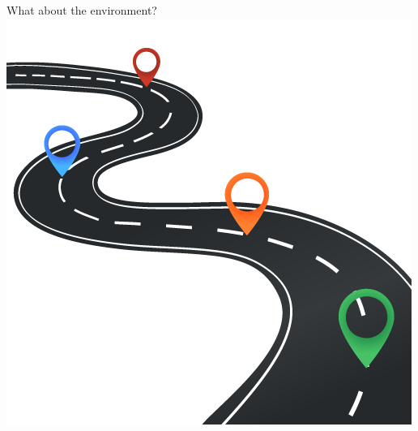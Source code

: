 \documentclass[aspectratio=169]{beamer}
\begin{document}
\begin{frame}[plain]
    \centering
    \Huge What about the environment?
    \includegraphics[height=.4\paperheight]{media/streets.png}
\end{frame}
\end{document}
